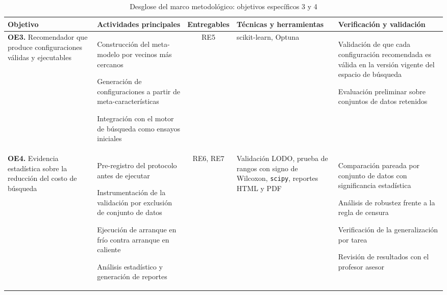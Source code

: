 \documentclass[12pt,letterpaper,oneside]{article}
\begin{document}
\begin{table}[H]
\centering
\small
\caption{Desglose del marco metodológico: objetivos específicos 3 y 4}
\label{tab:desglose-2}
\begin{tabularx}{\textwidth}{>{}L>{}L>{}C>{}L>{}L}
\toprule
\textbf{Objetivo} & \textbf{Actividades principales} & \textbf{Entrega\-bles} &
\textbf{Técnicas y herramientas} & \textbf{Verificación y validación} \\
\midrule
\textbf{OE3.} Recomendador que produce configuraciones válidas y ejecutables &
\begin{celdaitem}
  \item Construcción del meta-modelo por vecinos más cercanos
  \item Generación de configuraciones a partir de meta-características
  \item Integración con el motor de búsqueda como ensayos iniciales
\end{celdaitem} &
RE5 &
scikit-learn, Optuna &
\begin{celdaitem}
  \item Validación de que cada configuración recomendada es válida en la versión vigente
        del espacio de búsqueda
  \item Evaluación preliminar sobre conjuntos de datos retenidos
\end{celdaitem} \\
\addlinespace
\textbf{OE4.} Evidencia estadística sobre la reducción del costo de búsqueda &
\begin{celdaitem}
  \item Pre-registro del protocolo antes de ejecutar
  \item Instrumentación de la validación por exclusión de conjunto de datos
  \item Ejecución de arranque en frío contra arranque en caliente
  \item Análisis estadístico y generación de reportes
\end{celdaitem} &
RE6, RE7 &
Validación LODO, prueba de rangos con signo de Wilcoxon, \texttt{scipy}, reportes
HTML y PDF &
\begin{celdaitem}
  \item Comparación pareada por conjunto de datos con significancia estadística
  \item Análisis de robustez frente a la regla de censura
  \item Verificación de la generalización por tarea
  \item Revisión de resultados con el profesor asesor
\end{celdaitem} \\
\bottomrule
\end{tabularx}
\end{table}
\end{document}
